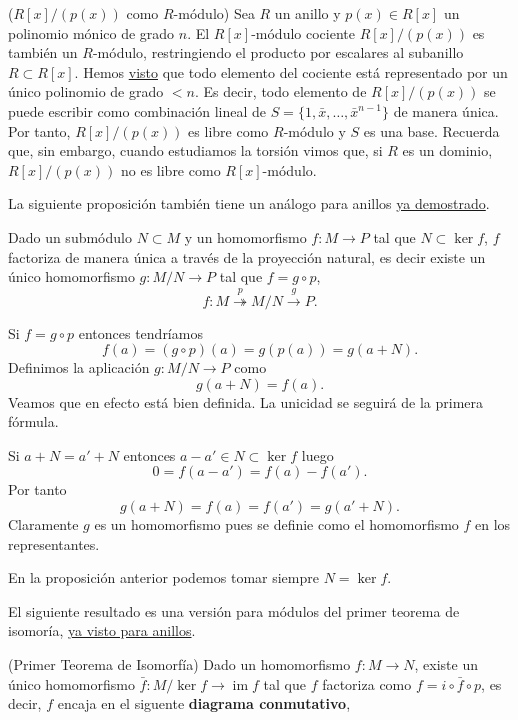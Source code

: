 \textrm{\normalfont ($R[x]/(p(x))$ como $R$-módulo)} Sea
\(R\) un anillo y \(p(x)\in R[x]\) un polinomio mónico de grado \(n\).
El \(R[x]\)-módulo cociente \(R[x]/(p(x))\) es también un \(R\)-módulo,
restringiendo el producto por escalares al subanillo \(R\subset R[x]\).
Hemos \href{static/rings/definitions/\#uniquerep}{visto} que todo elemento
del cociente está representado por un único polinomio de grado \(<n\).
Es decir, todo elemento de \(R[x]/(p(x))\) se puede escribir como
combinación lineal de \(S=\{1,\bar{x},\dots,\bar{x}^{n-1}\}\) de
manera única. Por tanto, \(R[x]/(p(x))\) es libre como \(R\)-módulo y
\(S\) es una base. Recuerda que, sin embargo, cuando estudiamos la
torsión vimos que, si \(R\) es un dominio, \(R[x]/(p(x))\) no es libre
como \(R[x]\)-módulo. 

La siguiente proposición también tiene un análogo para anillos
\href{/estalg/rings/definitions/\#factorquotient}{ya demostrado}.

\label{factorquotientmodules} Dado un submódulo
\(N\subset M\) y un homomorfismo \(f\colon M\rightarrow P\) tal que
\(N\subset \ker f\), \(f\) factoriza de manera única a través de la
proyección natural, es decir existe un único homomorfismo
\(g\colon M/N\rightarrow P\) tal que \(f=g\circ p\),
\[f\colon M\stackrel{p}\twoheadrightarrow M/N\stackrel{g}\rightarrow P.\]


Si \(f=g\circ p\) entonces tendríamos
\[f(a)=(g\circ p)(a)=g(p(a))=g(a+N).\] Definimos la aplicación
\(g\colon M/N\rightarrow P\) como \[g(a+N)=f(a).\] Veamos que en efecto
está bien definida. La unicidad se seguirá de la primera fórmula.

Si \(a+N=a'+N\) entonces \(a-a'\in N\subset\ker f\) luego
\[0=f(a-a')=f(a)-f(a').\] Por tanto \[g(a+N)=f(a)=f(a')=g(a'+N).\]
Claramente \(g\) es un homomorfismo pues se definie como el homomorfismo
\(f\) en los representantes.\\


En la proposición anterior podemos tomar siempre \(N=\ker f\).

El siguiente resultado es una versión para módulos del primer teorema de
isomoría, \href{/estalg/rings/definitions/\#primer}{ya visto para
anillos}.

\textrm{\normalfont (Primer Teorema de Isomorfía)}\label{isomodules}
Dado un homomorfismo \(f\colon M\rightarrow N\), existe un único
homomorfismo \(\bar f\colon M/\ker f\rightarrow \operatorname{im}f\) tal
que \(f\) factoriza como \(f=i\circ\bar f\circ p\), es decir, \(f\)
encaja en el siguente \textbf{diagrama conmutativo},

